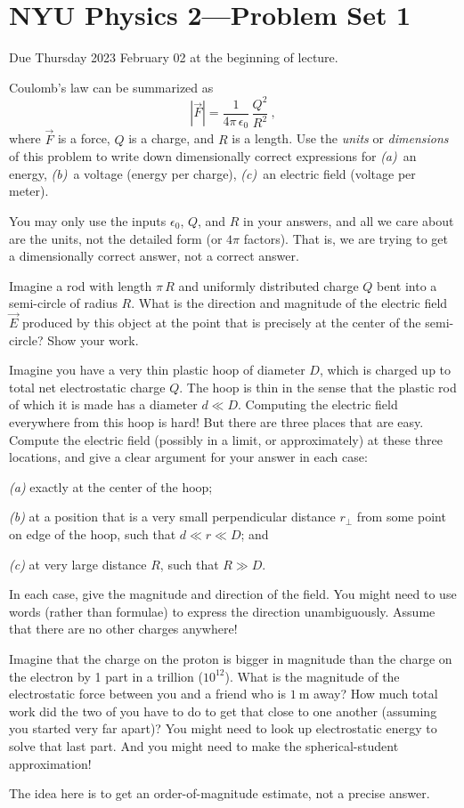 \documentclass[12pt]{article}
\begin{document}
\section*{NYU Physics 2---Problem Set 1}

Due Thursday 2023 February 02 at the beginning of lecture.

\startproblem%
Coulomb's law can be summarized as
\begin{equation}
  |\vec{F}| = \frac{1}{4\pi\,\epsilon_0}\,\frac{Q^2}{R^2}~,
\end{equation}
where $\vec{F}$ is a force, $Q$ is a charge, and $R$ is a length.
Use the \emph{units} or \emph{dimensions} of this problem to write
down dimensionally correct expressions for
\textsl{(a)}~an energy,
\textsl{(b)}~a voltage (energy per charge),
\textsl{(c)}~an electric field (voltage per meter).

You may only use the inputs $\epsilon_0$, $Q$, and $R$ in your answers, and all
we care about are the units, not the detailed form (or $4\pi$ factors).
That is, we are trying to get a dimensionally correct answer, not a correct answer.

\startproblem%
Imagine a rod with length $\pi\,R$ and uniformly distributed charge
$Q$ bent into a semi-circle of radius $R$.  What is the direction and
magnitude of the electric field $\vec{E}$ produced by this object
at the point that is precisely at the center of the semi-circle?
Show your work.

\startproblem%
Imagine you have a very thin plastic hoop of diameter $D$, which is
charged up to total net electrostatic charge $Q$.
The hoop is thin in the sense that the plastic rod of which it is
made has a diameter $d\ll D$.
Computing the electric field everywhere from this hoop is hard!
But there are three places that are easy.
Compute the electric field (possibly in a limit, or approximately)
at these three locations, and give a clear argument for your answer
in each case:

\textsl{(a)} exactly at the center of the hoop;

\textsl{(b)} at a position that is a very small perpendicular
distance $r_\perp$ from some point on edge of the hoop,
such that $d\ll r\ll D$; and

\textsl{(c)} at very large distance $R$, such that $R\gg D$.

In each case, give the magnitude and direction of the field. You might
need to use words (rather than formulae) to express the direction
unambiguously.
Assume that there are no other charges anywhere!

\startproblem%
Imagine that the charge on the proton is bigger in magnitude than the
charge on the electron by 1 part in a trillion ($10^{12}$).  What is
the magnitude of the electrostatic force between you and a friend who
is $1~\mathrm{m}$ away?  How much total work did the two of you have
to do to get that close to one another (assuming you started very far
apart)? You might need to look up electrostatic energy to solve that last part.
And you might need to make the spherical-student approximation!

The idea here is to get an order-of-magnitude estimate, not a precise answer.
\end{document}
